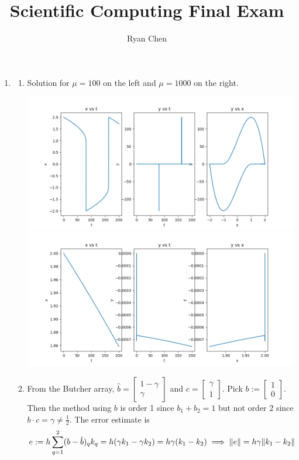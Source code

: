 \documentclass{article}
\title{Scientific Computing Final Exam}
\author{Ryan Chen}
\newcommand{\m}[2][b]{\begin{#1matrix}#2\end{#1matrix}}
\newcommand{\imp}{\implies}
\newcommand{\g}{\gamma}
\begin{document}
	
\maketitle



\begin{enumerate}
	
	
	
\item 

\begin{enumerate}
	
	
	\item Solution for $\mu=100$ on the left and $\mu=1000$ on the right.
	\begin{center}
		\includegraphics[scale=.2]{final 1 mu = 100}
		\includegraphics[scale=.2]{final 1 mu = 1000}
	\end{center}

	
	\item From the Butcher array, $\hat b=\m{1-\g\\\g}$ and $c=\m{\g\\1}$. Pick $b:=\m{1\\0}$. Then the method using $b$ is order 1 since $b_1+b_2=1$ but not order 2 since $b\cdot c=\g\ne\frac12$. The error estimate is
	\[e := h\sum_{q=1}^2(b-\hat b)_qk_q
	= h(\g k_1-\g k_2)
	= h\g(k_1-k_2)
	\imp \norm{e} = h\g\norm{k_1-k_2}\]
	

\end{enumerate}
\end{enumerate}
\end{document}
